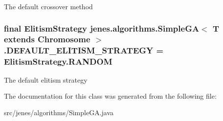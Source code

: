 The default crossover method \hypertarget{classjenes_1_1algorithms_1_1_simple_g_a_3_01_t_01extends_01_chromosome_01_4_b95f26a5f33145a73eed2832becb962f}{
\subsubsection[DEFAULT\_\-ELITISM\_\-STRATEGY]{\setlength{\rightskip}{0pt plus 5cm}final ElitismStrategy jenes.algorithms.SimpleGA$<$ T extends Chromosome $>$.{\bf DEFAULT\_\-ELITISM\_\-STRATEGY} = ElitismStrategy.RANDOM}}
\label{classjenes_1_1algorithms_1_1_simple_g_a_3_01_t_01extends_01_chromosome_01_4_b95f26a5f33145a73eed2832becb962f}


The default elitism strategy 

The documentation for this class was generated from the following file:\begin{CompactItemize}
\item 
src/jenes/algorithms/SimpleGA.java\end{CompactItemize}
